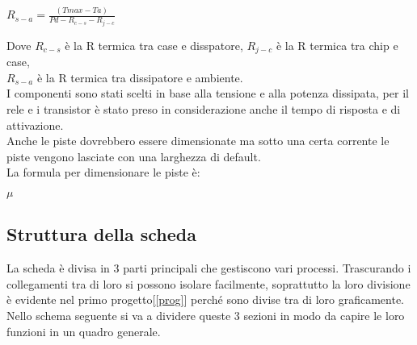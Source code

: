 \documentclass{article}
\begin{document}
\begin{center}
$R_{s-a}=\frac{(Tmax-Ta)}{Pd-R_{c-s}-R_{j-c}}$\\
\end{center}
\noindent
Dove \textit{$R_{c-s}$} è la R termica tra case e disspatore, \textit{$R_{j-c}$} è la R termica tra chip e case,\\ \textit{$R_{s-a}$} è la R termica tra dissipatore e ambiente.\\
I componenti sono stati scelti in base alla tensione e alla potenza dissipata, per il rele e i transistor è stato preso in considerazione anche il tempo di risposta e di attivazione.\\
Anche le piste dovrebbero essere dimensionate ma sotto una certa corrente le piste vengono lasciate con una larghezza di default.\\ 
La formula per dimensionare le piste è:
\begin{center}
    $\mu$
\end{center}
\subsection{Struttura della scheda}
La scheda è divisa in 3 parti principali che gestiscono vari processi. Trascurando i collegamenti tra di loro si possono isolare facilmente,
soprattutto la loro divisione è evidente nel primo progetto[\ref{prog}] perché sono divise tra di loro graficamente.\\
Nello schema seguente si va a dividere queste 3 sezioni in modo da capire le loro funzioni in un quadro generale.\\
\end{document}

